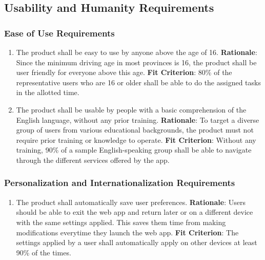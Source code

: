 \documentclass[12pt]{article}
\begin{document}
\subsection{Usability and Humanity Requirements}
\subsubsection{Ease of Use Requirements}
\begin{enumerate}[nfr]
    \item The product shall be easy to use by anyone above the age of 16.
    \newline \textbf{Rationale}: Since the minimum driving age in most provinces is 16, the product shall be user friendly for everyone above this age.
    \newline \textbf{Fit Criterion}: 80\% of the representative users who are 16 or older shall be able to do the assigned tasks in the allotted time.
    \item The product shall be usable by people with a basic comprehension of the English language, without any prior training. 
    \newline \textbf{Rationale}: To target a diverse group of users from various educational backgrounds, the product must not require prior training or knowledge to operate.
    \newline \textbf{Fit Criterion}: Without any training, 90\% of a sample English-speaking group shall be able to navigate through the different services offered by the app. 
\end{enumerate}

\subsubsection{Personalization and Internationalization Requirements}
\begin{enumerate}[nfr]
    \item The product shall automatically save user preferences.
    \newline \textbf{Rationale}: Users should be able to exit the web app and return later or on a different device with the same settings applied. This saves them time from making modifications everytime they launch the web app.
    \newline \textbf{Fit Criterion}: The settings applied by a user shall automatically apply on other devices at least 90\% of the times. 
\end{enumerate}
\end{document}
